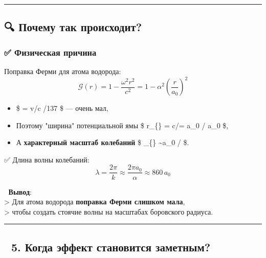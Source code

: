 \documentclass[11pt]{article}
\providecommand{\tightlist}{%
      \setlength{\itemsep}{0pt}\setlength{\parskip}{0pt}}
\begin{document}
\begin{center}\rule{0.5\linewidth}{\linethickness}\end{center}

\subsection{🔍 Почему так
происходит?}\label{ux43fux43eux447ux435ux43cux443-ux442ux430ux43a-ux43fux440ux43eux438ux441ux445ux43eux434ux438ux442}

\subsubsection{✅ Физическая
причина}\label{ux444ux438ux437ux438ux447ux435ux441ux43aux430ux44f-ux43fux440ux438ux447ux438ux43dux430}

Поправка Ферми для атома водорода: \[
\mathcal{G}(r) = 1 - \frac{\omega^2 r^2}{c^2} = 1 - \alpha^2 \left( \frac{r}{a_0} \right)^2
\]

\begin{itemize}
\tightlist
\item
  \$ \alpha = v/c /137 \$ --- очень мал,
\item
  Поэтому "ширина" потенциальной ямы \$ r\_\{\} = c/\omega =
  a\_0 / \alpha {} a\_0 \$,
\item
  А \textbf{характерный масштаб колебаний} \$ \lambda\_\{\}
  \sim a\_0 / \alpha \$.
\end{itemize}

✅ Длина волны колебаний: \[
\lambda = \frac{2\pi}{k} \approx \frac{2\pi a_0}{\alpha} \approx 860 \, a_0
\]

📌 \textbf{Вывод}:\\
\textgreater{} Для атома водорода \textbf{поправка Ферми слишком
мала},\\
\textgreater{} чтобы создать стоячие волны на масштабах боровского
радиуса.

\begin{center}\rule{0.5\linewidth}{\linethickness}\end{center}

\subsection{🔹 5. Когда эффект становится
заметным?}\label{ux43aux43eux433ux434ux430-ux44dux444ux444ux435ux43aux442-ux441ux442ux430ux43dux43eux432ux438ux442ux441ux44f-ux437ux430ux43cux435ux442ux43dux44bux43c}
\end{document}
